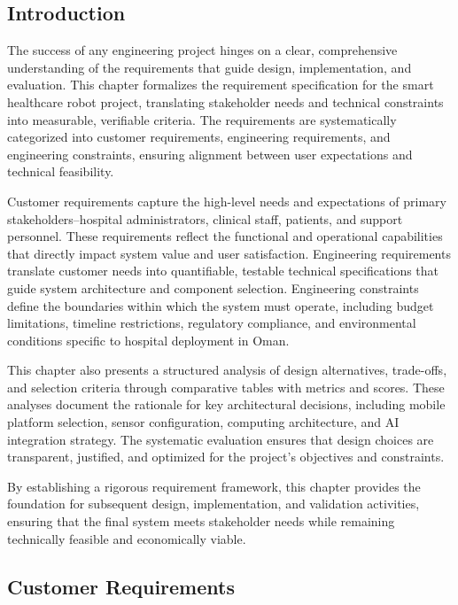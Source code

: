 \subsection{Introduction}

The success of any engineering project hinges on a clear, comprehensive understanding of the requirements that guide design, implementation, and evaluation. This chapter formalizes the requirement specification for the smart healthcare robot project, translating stakeholder needs and technical constraints into measurable, verifiable criteria. The requirements are systematically categorized into customer requirements, engineering requirements, and engineering constraints, ensuring alignment between user expectations and technical feasibility.

Customer requirements capture the high-level needs and expectations of primary stakeholders--hospital administrators, clinical staff, patients, and support personnel. These requirements reflect the functional and operational capabilities that directly impact system value and user satisfaction. Engineering requirements translate customer needs into quantifiable, testable technical specifications that guide system architecture and component selection. Engineering constraints define the boundaries within which the system must operate, including budget limitations, timeline restrictions, regulatory compliance, and environmental conditions specific to hospital deployment in Oman.

This chapter also presents a structured analysis of design alternatives, trade-offs, and selection criteria through comparative tables with metrics and scores. These analyses document the rationale for key architectural decisions, including mobile platform selection, sensor configuration, computing architecture, and AI integration strategy. The systematic evaluation ensures that design choices are transparent, justified, and optimized for the project's objectives and constraints.

By establishing a rigorous requirement framework, this chapter provides the foundation for subsequent design, implementation, and validation activities, ensuring that the final system meets stakeholder needs while remaining technically feasible and economically viable.

\subsection{Customer Requirements}

